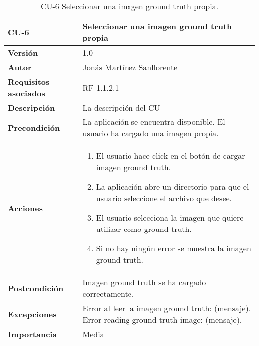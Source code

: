 \begin{table}[p]
	\centering
	\begin{tabularx}{\linewidth}{ p{} p{} }
		\toprule
		\textbf{CU-6}    & \textbf{Seleccionar una imagen ground truth propia}\\
		\toprule
		\textbf{Versión}              & 1.0    \\
		\textbf{Autor}                & Jonás Martínez Sanllorente \\
		\textbf{Requisitos asociados} & RF-1.1.2.1 \\
		\textbf{Descripción}          & La descripción del CU \\
		\textbf{Precondición}         & La aplicación se encuentra disponible.\newline
                                        El usuario ha cargado una imagen propia. \\
		\textbf{Acciones}             &
		\begin{enumerate}
			\def\labelenumi{\arabic{enumi}.}
			\tightlist
			\item El usuario hace click en el botón de cargar imagen ground truth.
			\item La aplicación abre un directorio para que el usuario seleccione el archivo que desee.
            \item El usuario selecciona la imagen que quiere utilizar como ground truth.
            \item Si no hay ningún error se muestra la imagen ground truth.
		\end{enumerate}\\
		\textbf{Postcondición}        & Imagen ground truth se ha cargado correctamente. \\
		\textbf{Excepciones}          & Error al leer la imagen ground truth: (mensaje).\newline
                                        Error reading ground truth image: (mensaje). \\
		\textbf{Importancia}          & Media \\
		\bottomrule
	\end{tabularx}
	\caption{CU-6 Seleccionar una imagen ground truth propia.}
\end{table}

